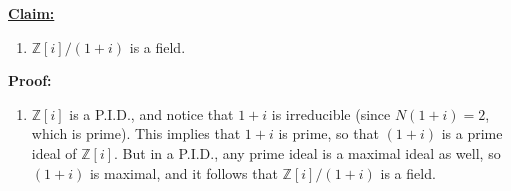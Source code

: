 \documentclass{article}
\begin{document}
\noindent \textbf{\underline{Claim:}}
\begin{enumerate}
    \item $\mathbb{Z}[i]/(1+i)$ is a field.
\end{enumerate}

\noindent \textbf{Proof:}
\begin{enumerate}
    \item $\mathbb{Z}[i]$ is a P.I.D., and notice that $1+i$ is irreducible (since $N(1+i) = 2$, which is prime). This implies that $1+i$ is prime, so that $(1+i)$ is a prime ideal of $\mathbb{Z}[i]$. But in a P.I.D., any prime ideal is a maximal ideal as well, so $(1+i)$ is maximal, and it follows that $\mathbb{Z}[i]/(1+i)$ is a field. 
\end{enumerate}
\end{document}
